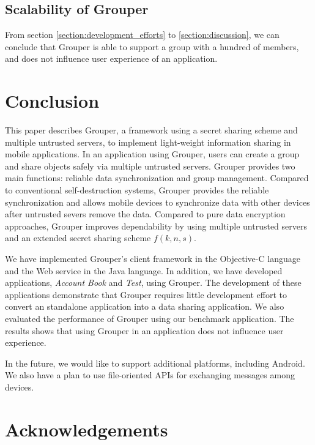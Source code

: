 \documentclass[a4paper,11pt]{report}
\begin{document}
\section{Scalability of Grouper} \label{section:grouper_scalability}

From section \ref{section:development_efforts} to \ref{section:discussion}, we can conclude that Grouper is able to support a group with a hundred of members, and does not influence user experience of an application.

\chapter{Conclusion} \label{chapter:conclusion}

This paper describes Grouper, a framework using a secret sharing scheme and multiple untrusted servers, to implement light-weight information sharing in mobile applications.
In an application using Grouper, users can create a group and share objects safely via multiple untrusted servers.
Grouper provides two main functions: reliable data synchronization and group management.
Compared to conventional self-destruction systems, Grouper provides the reliable synchronization and allows mobile devices to synchronize data with other devices after untrusted severs remove the data.
Compared to pure data encryption approaches, Grouper improves dependability by using multiple untrusted servers and an extended secret sharing scheme $f(k, n, s)$.

We have implemented Grouper's client framework in the Objective-C language and the Web service in the Java language. 
In addition, we have developed applications, \emph{Account Book} and \emph{Test}, using Grouper.
The development of these applications demonstrate that Grouper requires little development effort to convert an standalone application into a data sharing application.
We also evaluated the performance of Grouper using our benchmark application.
The results shows that using Grouper in an application does not influence user experience.

In the future, we would like to support additional platforms, including Android.
We also have a plan to use file-oriented APIs for exchanging messages among devices.

\chapter*{Acknowledgements}
\end{document}
